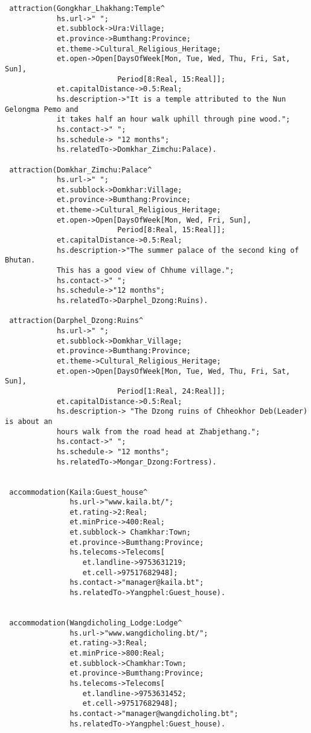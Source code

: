 \begin{verbatim}
 attraction(Gongkhar_Lhakhang:Temple^
            hs.url->" ";
            et.subblock->Ura:Village;
            et.province->Bumthang:Province;
            et.theme->Cultural_Religious_Heritage;
            et.open->Open[DaysOfWeek[Mon, Tue, Wed, Thu, Fri, Sat, Sun],
                          Period[8:Real, 15:Real]];
            et.capitalDistance->0.5:Real;
            hs.description->"It is a temple attributed to the Nun Gelongma Pemo and 
            it takes half an hour walk uphill through pine wood.";
            hs.contact->" ";
            hs.schedule-> "12 months";
            hs.relatedTo->Domkhar_Zimchu:Palace).
      
 attraction(Domkhar_Zimchu:Palace^
            hs.url->" ";
            et.subblock->Domkhar:Village;
            et.province->Bumthang:Province;
            et.theme->Cultural_Religious_Heritage;
            et.open->Open[DaysOfWeek[Mon, Wed, Fri, Sun],
                          Period[8:Real, 15:Real]];
            et.capitalDistance->0.5:Real;
            hs.description->"The summer palace of the second king of Bhutan.
            This has a good view of Chhume village.";
            hs.contact->" ";
            hs.schedule->"12 months";
            hs.relatedTo->Darphel_Dzong:Ruins).          

 attraction(Darphel_Dzong:Ruins^
            hs.url->" ";
            et.subblock->Domkhar_Village;
            et.province->Bumthang:Province;
            et.theme->Cultural_Religious_Heritage;
            et.open->Open[DaysOfWeek[Mon, Tue, Wed, Thu, Fri, Sat, Sun],
                          Period[1:Real, 24:Real]];
            et.capitalDistance->0.5:Real;
            hs.description-> "The Dzong ruins of Chheokhor Deb(Leader) is about an 
            hours walk from the road head at Zhabjethang.";
            hs.contact->" ";
            hs.schedule-> "12 months";
            hs.relatedTo->Mongar_Dzong:Fortress).
                          
           
 accommodation(Kaila:Guest_house^
               hs.url->"www.kaila.bt/";
               et.rating->2:Real;
               et.minPrice->400:Real;
               et.subblock-> Chamkhar:Town;
               et.province->Bumthang:Province;
               hs.telecoms->Telecoms[
                  et.landline->9753631219;
                  et.cell->97517682948];
               hs.contact->"manager@kaila.bt";
               hs.relatedTo->Yangphel:Guest_house).

                  
 accommodation(Wangdicholing_Lodge:Lodge^
               hs.url->"www.wangdicholing.bt/";
               et.rating->3:Real;
               et.minPrice->800:Real;
               et.subblock->Chamkhar:Town;
               et.province->Bumthang:Province;
               hs.telecoms->Telecoms[
                  et.landline->9753631452;
                  et.cell->97517682948];
               hs.contact->"manager@wangdicholing.bt";
               hs.relatedTo->Yangphel:Guest_house).
                  

\end{verbatim}
